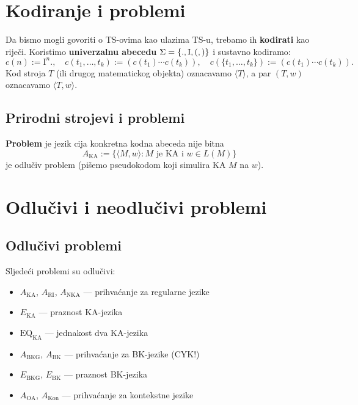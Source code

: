 \section{Kodiranje i problemi}

Da bismo mogli govoriti o TS-ovima kao ulazima TS-u, trebamo ih
\textbf{kodirati} kao riječi. Koristimo \textbf{univerzalnu abecedu}
$\Sigma = \{., \mathrm{I}, (, )\}$ i sustavno kodiramo:
\[
  c(n) := \mathrm{I}^n., \quad
  c(t_1, \ldots, t_k) := (c(t_1) \cdots c(t_k)), \quad
  c(\{t_1, \ldots, t_k\}) := (c(t_1) \cdots c(t_k)).
\]
Kod stroja $T$ (ili drugog matematickog objekta) oznacavamo $\langle T \rangle$,
a par $(T, w)$ oznacavamo $\langle T, w \rangle$.

\subsection{Prirodni strojevi i problemi}

\textbf{Problem} je jezik cija konkretna kodna abeceda nije bitna
\[
  A_\mathrm{KA} := \{\langle M, w \rangle : M \text{ je KA i } w \in L(M)\}
\]
je odlučiv problem (pišemo pseudokodom koji simulira KA $M$ na $w$).

\section{Odlučivi i neodlučivi problemi}

\subsection{Odlučivi problemi}

\begin{propozicija}
Sljedeći problemi su odlučivi:
\begin{itemize}
  \item $A_\mathrm{KA}$, $A_\mathrm{RI}$, $A_\mathrm{NKA}$ --- prihvaćanje za regularne jezike
  \item $E_\mathrm{KA}$ --- praznost KA-jezika
  \item $\mathrm{EQ}_\mathrm{KA}$ --- jednakost dva KA-jezika
  \item $A_\mathrm{BKG}$, $A_\mathrm{BK}$ --- prihvaćanje za BK-jezike (CYK!)
  \item $E_\mathrm{BKG}$, $E_\mathrm{BK}$ --- praznost BK-jezika
  \item $A_\mathrm{OA}$, $A_\mathrm{Kon}$ --- prihvaćanje za kontekstne jezike
\end{itemize}
\end{propozicija}

